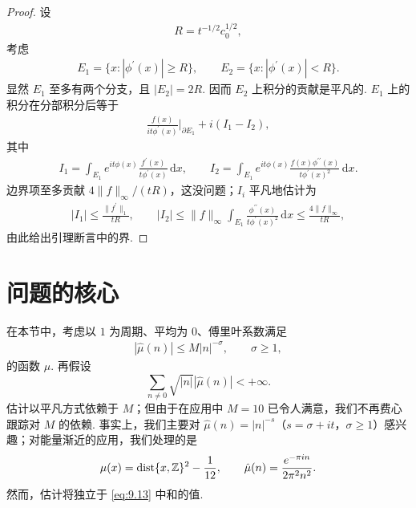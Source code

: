 \begin{proof}
设
\begin{align*}
  R=t^{-1/2}c_{0}^{1/2},
\end{align*}
考虑
\begin{align*}
  E_{1}=\{x:|\phi^{\prime}(x)|\geq R\},\qquad
  E_{2}=\{x:|\phi^{\prime}(x)|<R\}.
\end{align*}
显然 $E_1$ 至多有两个分支，且 $|E_2| = 2R$. 因而 $E_2$ 上积分的贡献是平凡的. $E_1$ 上的积分在分部积分后等于
\begin{align*}
  \frac{f(x)}{it\phi^{\prime}(x)}\Big|_{\partial E_{1}}+i(I_{1}-I_{2}),
\end{align*}
其中
\begin{align*}
  I_{1}=\int_{E_{1}}e^{i t\phi(x)}\frac{f^{\prime}(x)}{t\phi^{\prime}(x)}\,\mathrm{d}x,\qquad
  I_{2}=\int_{E_{1}}e^{i t\phi(x)}\frac{f(x)\phi^{\prime\prime}(x)}{t\phi^{\prime}(x)^{2}}\,\mathrm{d}x.
\end{align*}
边界项至多贡献 $4\|f\|_\infty/(tR)$，这没问题；$I_i$ 平凡地估计为
\begin{align*}
  |I_{1}|\leq\frac{\|f^{\prime}\|_{1}}{t R},
  \qquad
  |I_{2}|\leq\|f\|_{\infty}\int_{E_{1}}\frac{\phi^{\prime\prime}(x)}{t\phi^{\prime}(x)^{2}}\,\mathrm{d}x
  \leq\frac{4\|f\|_{\infty}}{t R},
\end{align*}
由此给出引理断言中的界.
\end{proof}

\section{问题的核心}

在本节中，考虑以 $1$ 为周期、平均为 $0$、傅里叶系数满足
\begin{align*}
  |\hat{\mu}(n)|\leq M|n|^{-\sigma},\qquad \sigma\geq 1,
\end{align*}
的函数 $\mu$. 再假设
\begin{equation}\label{eq:9.13}
  \sum_{n\neq 0}\sqrt{\left|n\right|}\left|\hat{\mu}(n)\right|<+\infty.
\end{equation}
估计以平凡方式依赖于 $M$；但由于在应用中 $M = 10$ 已令人满意，我们不再费心跟踪对 $M$ 的依赖. 事实上，我们主要对 $\hat{\mu}(n) = |n|^{-s}$（$s = \sigma + it$，$\sigma \geq 1$）感兴趣；对能量渐近的应用，我们处理的是
\begin{align*}
  \mu(x)=\operatorname{dist}\{x,\mathbb{Z}\}^{2}-\frac{1}{12},\qquad
  \hat{\mu}(n)=\frac{e^{-\pi i n}}{2\pi^{2}n^{2}}.
\end{align*}
然而，估计将独立于 \eqref{eq:9.13} 中和的值.

